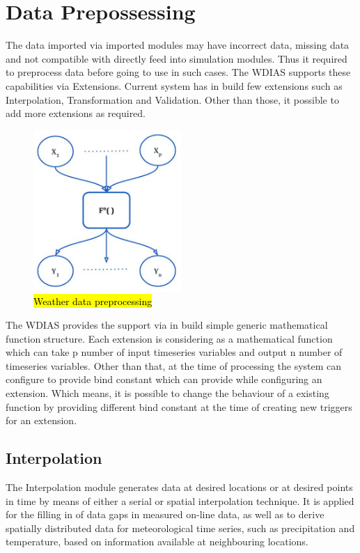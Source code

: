 \section{Data Prepossessing}

The data imported via imported modules may have incorrect data, missing data and not compatible with directly feed into simulation modules. 
Thus it required to preprocess data before going to use in such cases. The WDIAS supports these capabilities via Extensions. Current system has
in build few extensions such as Interpolation, Transformation and Validation. Other than those, it possible to add more extensions as required.
\begin{figure}[htp]
    \centering
    \includegraphics[width=0.5\textwidth]{method/data_preprocess/weather_data_preprocessing.jpg}
    \caption{\hl{Weather data preprocessing}}
    \label{fi:weather_data_preprocessing}
\end{figure}

The WDIAS provides the support via in build simple generic mathematical function structure. Each extension is considering as a mathematical function which can take p 
number of input timeseries variables and output n number of timeseries variables. Other than that, at the time of processing the system can configure to provide
bind constant which can provide while configuring an extension. Which means, it is possible to change the behaviour of a existing function by providing different bind
constant at the time of creating new triggers for an extension.

\subsection{Interpolation}
The Interpolation module generates data at desired locations or at desired points in time by means of either a serial or spatial interpolation technique. It is applied for the filling in of data gaps in measured on-line data, as well as to derive spatially distributed data for meteorological time series, such as precipitation and temperature, based on information available at neighbouring locations.

